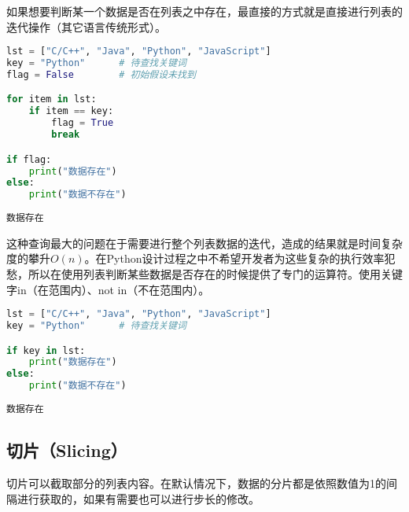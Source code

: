 如果想要判断某一个数据是否在列表之中存在，最直接的方式就是直接进行列表的迭代操作（其它语言传统形式）。\\


\begin{lstlisting}[language=Python]
lst = ["C/C++", "Java", "Python", "JavaScript"]
key = "Python"      # 待查找关键词
flag = False        # 初始假设未找到

for item in lst:
    if item == key:
        flag = True
        break

if flag:
    print("数据存在")
else:
    print("数据不存在")
\end{lstlisting}

\begin{tcolorbox}
	\begin{verbatim}
数据存在
\end{verbatim}
\end{tcolorbox}

这种查询最大的问题在于需要进行整个列表数据的迭代，造成的结果就是时间复杂度的攀升$ O(n) $。在Python设计过程之中不希望开发者为这些复杂的执行效率犯愁，所以在使用列表判断某些数据是否存在的时候提供了专门的运算符。使用关键字in（在范围内）、not in（不在范围内）。\\


\begin{lstlisting}[language=Python]
lst = ["C/C++", "Java", "Python", "JavaScript"]
key = "Python"      # 待查找关键词

if key in lst:
    print("数据存在")
else:
    print("数据不存在")
\end{lstlisting}

\begin{tcolorbox}
	\begin{verbatim}
数据存在
\end{verbatim}
\end{tcolorbox}

\vspace{0.5cm}

\subsection{切片（Slicing）}

切片可以截取部分的列表内容。在默认情况下，数据的分片都是依照数值为1的间隔进行获取的，如果有需要也可以进行步长的修改。\\

